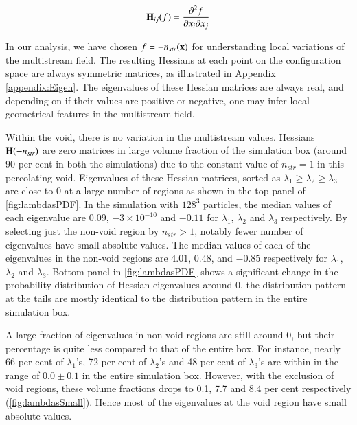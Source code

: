 \begin{equation}
\label{eq:aHess}
 {\bf H}_{ij}(f) = \frac{\partial^2 f}{\partial x_i \partial x_j} 
\end{equation}

In our analysis, we have chosen $f = -n_{str}(\bf{x})$ for understanding local variations of the multistream field. The resulting Hessians at each point on the configuration space are always symmetric matrices, as illustrated in Appendix \ref{appendix:Eigen}. The eigenvalues of these Hessian matrices are always real, and depending on if their values are positive or negative, one may infer local geometrical features in the multistream field. 

Within the void, there is no variation in the multistream values. Hessians ${\bf H}(-n_{str})$ are zero matrices in large volume fraction of the simulation box (around 90 per cent in both the simulations) due to the constant value of $n_{str} = 1$ in this percolating void. Eigenvalues of these Hessian matrices, sorted as $ \lambda_1 \geq \lambda_2 \geq \lambda_3 $ are close to 0 at a large number of regions as shown in the top panel of \autoref{fig:lambdasPDF}. In the simulation with $128^3$ particles, the median values of each eigenvalue are $0.09$, $-3\times 10^{-10}$ and $-0.11$ for  $\lambda_1$, $\lambda_2$ and $\lambda_3$ respectively. By selecting just the non-void region by $n_{str} > 1$, notably fewer number of eigenvalues have small absolute values. The median values of each of the eigenvalues in the non-void regions are $4.01$, $0.48$, and $-0.85$ respectively for $\lambda_1$, $\lambda_2$ and  $\lambda_3$. Bottom panel in \autoref{fig:lambdasPDF} shows a significant change in the probability distribution of Hessian eigenvalues around 0, the distribution pattern at the tails are mostly identical to the distribution pattern in the entire simulation box. 


A large fraction of eigenvalues in non-void regions are still around 0, but their percentage is quite less compared to that of the entire box. For instance, nearly 66 per cent of $\lambda_1$'s, 72 per cent of $\lambda_2$'s and 48 per cent of $\lambda_3$'s are  within in the range of $0.0 \pm 0.1$ in the entire simulation box. However, with the exclusion of void regions, these volume fractions drops to 0.1, 7.7 and 8.4 per cent respectively (\autoref{fig:lambdasSmall}). Hence most of the eigenvalues at the void region have small absolute values.

